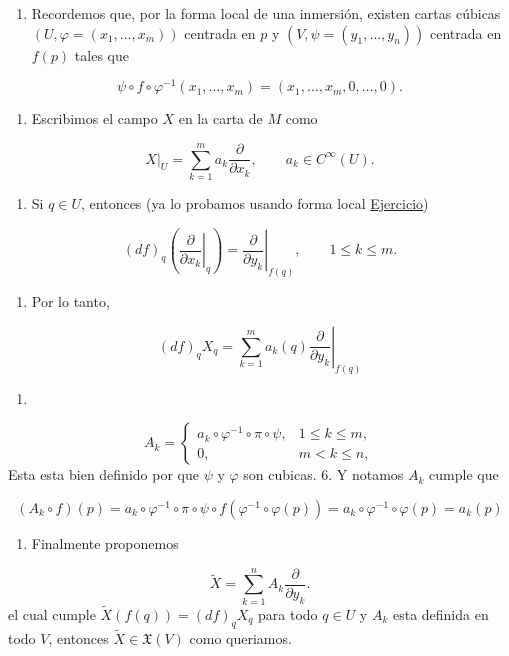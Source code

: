 \begin{bookproof}{}
\begin{enumerate}
\item Recordemos que, por la forma local de una inmersión, existen cartas cúbicas $(U,\varphi=(x_1,\ldots,x_m))$ centrada en $p$ y $(V,\psi=(y_1,\ldots,y_n))$ centrada en $f(p)$ tales que
\end{enumerate}
\[
\psi\circ f\circ\varphi^{-1}(x_1,\ldots,x_m)=(x_1,\ldots,x_m,0,\ldots,0).
\]
\begin{enumerate}[start=2]
\item Escribimos el campo $X$ en la carta de $M$ como
\end{enumerate}
\[
X|_U=\sum_{k=1}^m a_k\frac{\partial}{\partial x_k},\qquad a_k\in C^\infty(U).
\]
\begin{enumerate}[start=3]
\item Si $q\in U$, entonces (ya lo probamos usando forma local \hyperref[blk:b71da3]{Ejercicio})
\end{enumerate}
\[
(df)_q\left(\left.\frac{\partial}{\partial x_k}\right|_q\right)=\left.\frac{\partial}{\partial y_k}\right|_{f(q)},\qquad 1\le k\le m.
\]
\begin{enumerate}[start=4]
\item Por lo tanto,
\end{enumerate}
\[
(df)_qX_q=\sum_{k=1}^m a_k(q)\left.\frac{\partial}{\partial y_k}\right|_{f(q)}
\]
\begin{enumerate}[start=5]
\item 
\end{enumerate}
\[
A_k=\begin{cases}a_k\circ\varphi^{-1}\circ\pi\circ\psi,&1\le k\le m,\\0,&m<k\le n,\end{cases}
\]
Esta esta bien definido por que $\psi$ y $\varphi$ son cubicas. 6. Y notamos $A_{k}$ cumple que

\[
(A_{k}\circ f)(p)=a_{k}\circ\varphi ^{-1}\circ\pi\circ\psi\circ f(\varphi ^{-1} \circ\varphi(p))=a_{k}\circ\varphi ^{-1}\circ\varphi(p)=a_{k}(p)
\]
\begin{enumerate}[start=7]
\item Finalmente proponemos
\end{enumerate}
\[
\widetilde X=\sum_{k=1}^n A_k\frac{\partial}{\partial y_k}.
\]
el cual cumple $\widetilde{X}(f(q))=(df)_{q}X_{q}$ para todo $q\in U$ y $A_k$ esta definida en todo $V$, entonces $\widetilde X\in\mathfrak X(V)$ como queriamos.

\bookqed
\end{bookproof}
\label{blk:d0b758}
